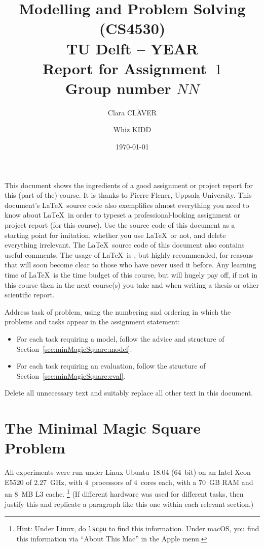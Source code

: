 \documentclass[a4paper,11pt]{article}
\title{\textbf{Modelling and Problem Solving (CS4530) \\
    TU Delft -- YEAR \\  %
    Report for Assignment~$1$ \\
    Group number $NN$  %
  }
}
\author{Clara CLÄVER \and Whiz KIDD}
\date{\today}
\begin{document}
\maketitle

\noindent
This document shows the ingredients of a good assignment or project
report for this (part of the) course.  It is thanks to Pierre Flener, Uppsala University.
%
This document's \LaTeX\ source code also exemplifies almost everything you need to
know about \LaTeX\ in order to typeset a professional-looking
assignment or project report (for this course).
%
Use the source code of this document as a starting point for
imitation, whether you use \LaTeX\ or not, and delete everything
irrelevant.  The \LaTeX\ source code of this document also contains
useful comments.  The usage of \LaTeX\ is , but
highly recommended, for reasons that will soon become clear to those
who have never used it before.  Any learning time of \LaTeX\ is
 the time budget of this course, but will hugely pay
off, if not in this course then in the next course(s) you take and
when writing a thesis or other scientific report.
%
\bigskip

Address  task of  problem, using the
numbering and ordering in which the problems and tasks appear in the
assignment statement:
\begin{itemize}
\item For each task requiring a model, follow the advice and structure
  of Section~\ref{sec:minMagicSquare:model}.
\item For each task requiring an evaluation, follow the structure of
  Section~\ref{sec:minMagicSquare:eval}.
\end{itemize}
Delete all unnecessary text and suitably replace all other text in
this document.

\part{The Minimal Magic Square Problem}
\setcounter{section}{0} %

All experiments were run under
Linux Ubuntu~18.04 ($64$~bit) on an Intel Xeon E5520 of $2.27$~GHz,
with $4$~processors of $4$~cores each, with a $70$~GB RAM and an
$8$~MB L3 cache.%
%
\footnote{Hint: Under Linux, do \texttt{lscpu} to find this
  information.  Under macOS, you find this information via ``About
  This Mac'' in the Apple menu.}
%
(If different hardware was used for different tasks, then justify this
and replicate a paragraph like this one within each relevant section.)
\end{document}
